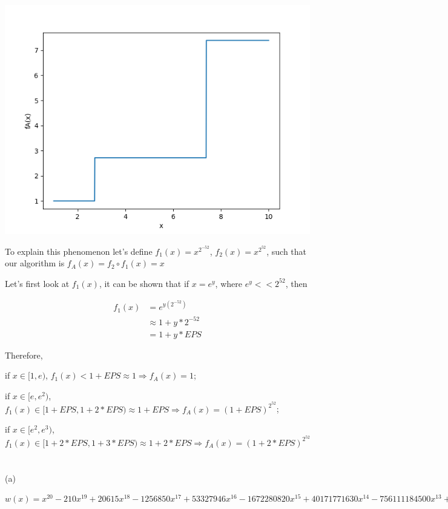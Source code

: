 \documentclass[10pt]{article}
\begin{document}
\section{}

\includegraphics[width=3 in]{p6.png}

To explain this phenomenon let's define $f_1(x)=x^{2^{-52}}$, $f_2(x)=x^{2^{52}}$, such that our algorithm is $f_A(x)=f_2\circ f_1(x)=x$

Let's first look at $f_1(x)$, it can be shown that if $x=e^y$, where $e^y<<2^{52}$, then 

\begin{align*}
f_1(x)&=e^{y(2^{-52})}\\
&\approx 1+y*2^{-52}\\
&=1+y*EPS
\end{align*}

Therefore, 

if $x\in[1,e)$, $f_1(x)<1+EPS\approx 1\Rightarrow f_A(x)=1$;

if $x\in[e,e^2)$, $f_1(x)\in[1+EPS,1+2*EPS)\approx 1+EPS\Rightarrow f_A(x)=(1+EPS)^{2^{52}}$;

if $x\in[e^2,e^3)$, $f_1(x)\in[1+2*EPS,1+3*EPS)\approx 1+2*EPS\Rightarrow f_A(x)=(1+2*EPS)^{2^{52}}$



\section{}

(a)

$w(x) = x^{20} -210x^{19}+                20615x^{18}
-1256850x^{17}             +53327946x^{16}          -1672280820x^{15}
+40171771630x^{14}        -756111184500x^{13}       +11310276995381x^{12}
-135585182899530x^{11}     +1307535010540395x^{10}   -10142299865511450x^9
+63030812099294896x^8  -311333643161390640x^7  +1206647803780373360x^6
-3599979517947607200x^5  +8037811822645051776x^4  +5575812828558562816x^3
-4642984320068847616x^2 -8752948036761600000x  +2432902008176640000$\\
\end{document}
